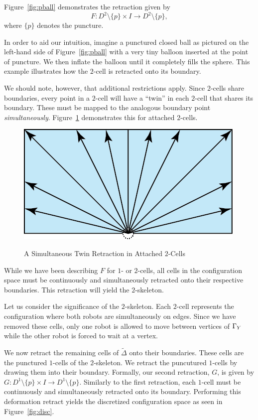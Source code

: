 Figure~\ref{fig:pball} demonstrates the retraction given by $$F\colon D^2\setminus \{p\}\times I \rightarrow D^2\setminus \{p\},$$ where $\{p\}$ denotes the puncture. 

In order to aid our intuition, imagine a punctured closed ball as pictured on the left-hand side of Figure~\ref{fig:pball} with a very tiny balloon inserted at the point of puncture. We then inflate the balloon until it completely fills the sphere. This example illustrates how the $2$-cell is retracted onto its boundary. 

We should note, however, that additional restrictions apply. Since $2$-cells share boundaries, every point in a $2$-cell will have a ``twin'' in each $2$-cell that shares its boundary. These  must be mapped to the analogous boundary point \textit{simultaneously}. Figure~\ref{fig:twins} demonstrates this for attached $2$-cells. 


\begin{figure}[ht]
\centering
\caption{A Simultaneous Twin Retraction in Attached $2$-Cells}
\vspace{3mm}
\includegraphics[scale=1]{Twins.png}
\label{fig:twins}
\end{figure}

While we have been describing $F$ for $1$- or $2$-cells, all cells in the configuration space must be continuously and simultaneously retracted onto their respective boundaries. This retraction will yield the $2$-skeleton. 

Let us consider the significance of the $2$-skeleton. Each $2$-cell represents the configuration where both robots are simultaneously on edges. Since we have removed these cells, only one robot is allowed to move between vertices of $\Gamma_Y$ while the other robot is forced to wait at a vertex.

We now retract the remaining cells of $\tilde{\Delta}$ onto their boundaries. These cells are the punctured $1$-cells of the $2$-skeleton. We retract the puncutured $1$-cells by drawing them into their boundary. Formally, our second retraction, $G$, is given by $G\colon D^1\setminus\{p\} \times I \rightarrow D^1\setminus\{p\} $. Similarly to the first retraction, each $1$-cell must be continuously and simultaneously retracted onto its boundary. Performing this deformation retract yields the discretized configuration space as seen in Figure~\ref{fig:disc}.


